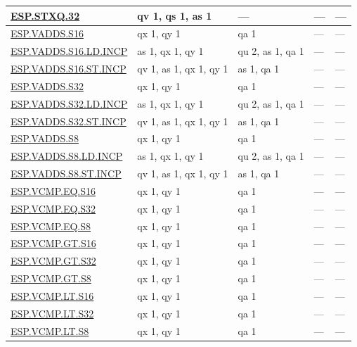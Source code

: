 \begin{longtable}[c]{|l|m{2.5cm}|m{2.5cm}|m{2.5cm}|m{2.5cm}|}
    \hyperref[instruction:ESPSTXQ32]{ESP.STXQ.32} & qv 1, qs 1, as 1 & — & — & — \\\hline
    \hyperref[instruction:ESPVADDSS16]{ESP.VADDS.S16} & qx 1, qy 1 & qa 1 & — & — \\\hline
    \hyperref[instruction:ESPVADDSS16LDINCP]{ESP.VADDS.S16.LD.INCP} & as 1, qx 1, qy 1 & qu 2, as 1, qa 1 & — & — \\\hline
    \hyperref[instruction:ESPVADDSS16STINCP]{ESP.VADDS.S16.ST.INCP} & qv 1, as 1, qx 1, qy 1 & as 1, qa 1 & — & — \\\hline
    \hyperref[instruction:ESPVADDSS32]{ESP.VADDS.S32} & qx 1, qy 1 & qa 1 & — & — \\\hline
    \hyperref[instruction:ESPVADDSS32LDINCP]{ESP.VADDS.S32.LD.INCP} & as 1, qx 1, qy 1 & qu 2, as 1, qa 1 & — & — \\\hline
    \hyperref[instruction:ESPVADDSS32STINCP]{ESP.VADDS.S32.ST.INCP} & qv 1, as 1, qx 1, qy 1 & as 1, qa 1 & — & — \\\hline
    \hyperref[instruction:ESPVADDSS8]{ESP.VADDS.S8} & qx 1, qy 1 & qa 1 & — & — \\\hline
    \hyperref[instruction:ESPVADDSS8LDINCP]{ESP.VADDS.S8.LD.INCP} & as 1, qx 1, qy 1 & qu 2, as 1, qa 1 & — & — \\\hline
    \hyperref[instruction:ESPVADDSS8STINCP]{ESP.VADDS.S8.ST.INCP} & qv 1, as 1, qx 1, qy 1 & as 1, qa 1 & — & — \\\hline
    \hyperref[instruction:ESPVCMPEQS16]{ESP.VCMP.EQ.S16} & qx 1, qy 1 & qa 1 & — & — \\\hline
    \hyperref[instruction:ESPVCMPEQS32]{ESP.VCMP.EQ.S32} & qx 1, qy 1 & qa 1 & — & — \\\hline
    \hyperref[instruction:ESPVCMPEQS8]{ESP.VCMP.EQ.S8} & qx 1, qy 1 & qa 1 & — & — \\\hline
    \hyperref[instruction:ESPVCMPGTS16]{ESP.VCMP.GT.S16} & qx 1, qy 1 & qa 1 & — & — \\\hline
    \hyperref[instruction:ESPVCMPGTS32]{ESP.VCMP.GT.S32} & qx 1, qy 1 & qa 1 & — & — \\\hline
    \hyperref[instruction:ESPVCMPGTS8]{ESP.VCMP.GT.S8} & qx 1, qy 1 & qa 1 & — & — \\\hline
    \hyperref[instruction:ESPVCMPLTS16]{ESP.VCMP.LT.S16} & qx 1, qy 1 & qa 1 & — & — \\\hline
    \hyperref[instruction:ESPVCMPLTS32]{ESP.VCMP.LT.S32} & qx 1, qy 1 & qa 1 & — & — \\\hline
    \hyperref[instruction:ESPVCMPLTS8]{ESP.VCMP.LT.S8} & qx 1, qy 1 & qa 1 & — & — \\\hline

\end{longtable}
